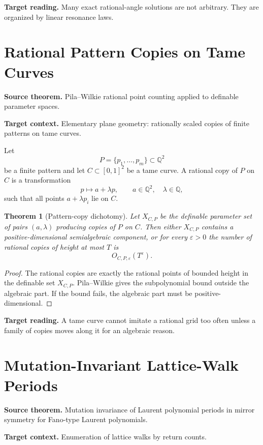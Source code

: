 \documentclass[11pt]{article}
\newtheorem{theorem}{Theorem}[section]
\begin{document}
\textbf{Target reading.}
Many exact rational-angle solutions are not arbitrary. They are organized by linear resonance laws.

\section{Rational Pattern Copies on Tame Curves}

\textbf{Source theorem.}
Pila--Wilkie rational point counting applied to definable parameter spaces.

\textbf{Target context.}
Elementary plane geometry: rationally scaled copies of finite patterns on tame curves.

Let
\[
P=\{p_1,\ldots,p_m\}\subset\mathbb Q^2
\]
be a finite pattern and let \(C\subset[0,1]^2\) be a tame curve. A rational copy of \(P\) on \(C\) is a transformation
\[
p\mapsto a+\lambda p,
\qquad
a\in\mathbb Q^2,\quad \lambda\in\mathbb Q,
\]
such that all points \(a+\lambda p_i\) lie on \(C\).

\begin{theorem}[Pattern-copy dichotomy]
Let \(X_{C,P}\) be the definable parameter set of pairs \((a,\lambda)\) producing copies of \(P\) on \(C\). Then either \(X_{C,P}\) contains a positive-dimensional semialgebraic component, or for every \(\varepsilon>0\) the number of rational copies of height at most \(T\) is
\[
O_{C,P,\varepsilon}(T^\varepsilon).
\]
\end{theorem}

\begin{proof}
The rational copies are exactly the rational points of bounded height in the definable set \(X_{C,P}\). Pila--Wilkie gives the subpolynomial bound outside the algebraic part. If the bound fails, the algebraic part must be positive-dimensional.
\end{proof}

\textbf{Target reading.}
A tame curve cannot imitate a rational grid too often unless a family of copies moves along it for an algebraic reason.

\section{Mutation-Invariant Lattice-Walk Periods}

\textbf{Source theorem.}
Mutation invariance of Laurent polynomial periods in mirror symmetry for Fano-type Laurent polynomials.

\textbf{Target context.}
Enumeration of lattice walks by return counts.
\end{document}
